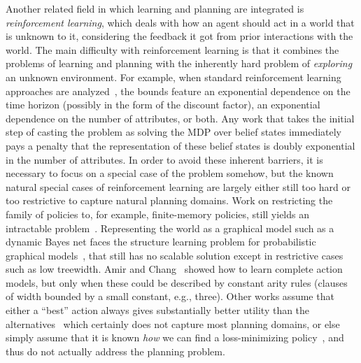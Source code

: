 \documentclass[12pt]{article}
\begin{document}
Another related field in which learning and planning are integrated is {\em reinforcement learning}, which deals with how an agent
should act in a world that is unknown to it, considering the feedback it got from prior interactions with the world. The main difficulty with reinforcement learning is that it combines the problems of learning and planning with the inherently hard problem of {\em exploring} an unknown environment. For example, when standard reinforcement learning approaches are analyzed~\cite{kearns2002POMDPsample,shani2005modelPOMDP}, the bounds feature an exponential dependence on the time horizon (possibly in the form of the discount factor), an exponential dependence on the number of attributes, or both. Any work that takes the initial step of casting the problem as solving the MDP over belief states immediately pays a penalty that the representation of these belief states is doubly exponential in the number of attributes.  In order to avoid these inherent barriers, it is necessary to focus on a special case of the problem somehow, but the known natural special cases of reinforcement learning are largely either still too hard or too restrictive to capture natural planning domains. Work on restricting the family of policies to, for example, finite-memory policies, still yields an intractable problem~\cite{meuleau1999finitestate}. Representing the world as a graphical model such as a dynamic Bayes net faces the structure learning problem for probabilistic graphical models~\cite[Section~19.4]{koller2009pgm}, that still has no scalable solution except in restrictive cases such as low treewidth. 
  Amir and Chang~\cite{amir2008} showed how to learn complete action models, but only when these could be described by constant arity rules (clauses of width bounded by a small constant, e.g., three).
  Other works assume that either a ``best'' action always gives substantially better utility than the alternatives~\cite{fern2006policyIteration} which certainly does not capture most planning domains, or else simply assume that it is known {\em how} we can find a loss-minimizing policy~\cite{lazaric2010policyIteration}, and thus do not actually address the planning problem.


\end{document}
